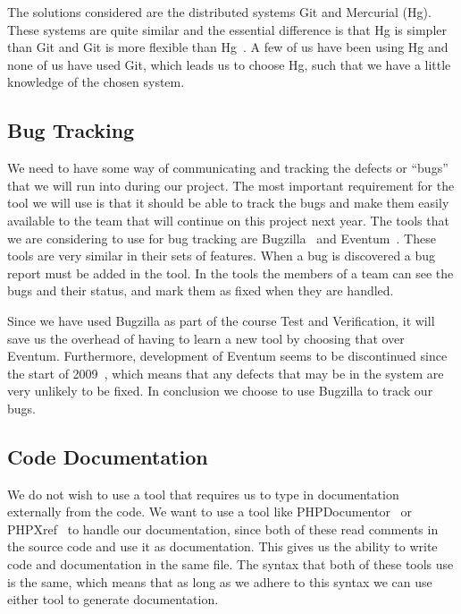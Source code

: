The solutions considered are the distributed systems Git and Mercurial (Hg).
These systems are quite similar and the essential difference is that Hg is simpler than Git and Git is more flexible than Hg~\cite{gitVsHg}.
A few of us have been using Hg and none of us have used Git, which leads us to choose Hg, such that we have a little knowledge of the chosen system.

\subsection{Bug Tracking}
We need to have some way of communicating and tracking the defects or ``bugs'' that we will run into during our project.
The most important requirement for the tool we will use is that it should be able to track the bugs and make them easily available to the team that will continue on this project next year.
The tools that we are considering to use for bug tracking are Bugzilla~\cite{bugzillaFeat} and Eventum~\cite{eventumFeat}.
These tools are very similar in their sets of features.
When a bug is discovered a bug report must be added in the tool.
In the tools the members of a team can see the bugs and their status, and mark them as fixed when they are handled.

Since we have used Bugzilla as part of the course Test and Verification, it will save us the overhead of having to learn a new tool by choosing that over Eventum.
Furthermore, development of Eventum seems to be discontinued since the start of 2009~\cite{eventumDiscont}, which means that any defects that may be in the system are very unlikely to be fixed.
In conclusion we choose to use Bugzilla to track our bugs.

\subsection{Code Documentation}
We do not wish to use a tool that requires us to type in documentation externally from the code.
We want to use a tool like PHPDocumentor~\cite{phpdocumentor} or PHPXref~\cite{phpxref} to handle our documentation, since both of these read comments in the source code and use it as documentation.
This gives us the ability to write code and documentation in the same file.
The syntax that both of these tools use is the same, which means that as long as we adhere to this syntax we can use either tool to generate documentation.


